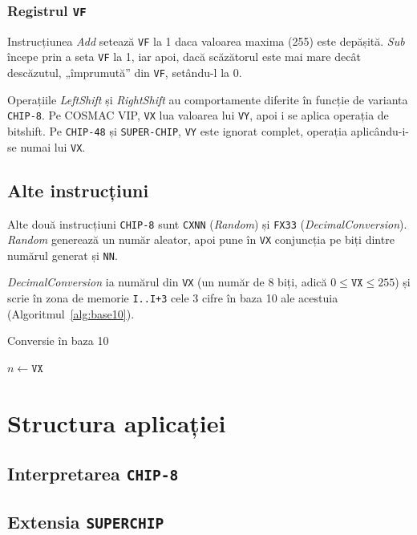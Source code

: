 \documentclass[a4paper]{article}
\begin{document}
\subsubsection{Registrul \texttt{VF}}
Instrucțiunea \textit{Add} setează \texttt{VF} la 1 daca valoarea maxima (255) este depășită. \textit{Sub} începe prin a seta \texttt{VF} la 1, iar apoi,
dacă scăzătorul este mai mare decât descăzutul, „împrumută” din \texttt{VF}, setându-l la 0.

Operațiile \textit{LeftShift} și \textit{RightShift} au comportamente diferite în funcție de varianta \texttt{CHIP-8}. Pe COSMAC VIP, \texttt{VX} lua valoarea
lui \texttt{VY}, apoi i se aplica operația de bitshift. Pe \texttt{CHIP-48} și \texttt{SUPER-CHIP}, \texttt{VY} este ignorat complet, operația aplicându-i-se
numai lui \texttt{VX}.

\subsection{Alte instrucțiuni}
Alte două instrucțiuni \texttt{CHIP-8} sunt \texttt{CXNN} (\textit{Random}) și \texttt{FX33} (\textit{DecimalConversion}).
\textit{Random} generează un număr aleator, apoi pune în \texttt{VX} conjuncția pe biți dintre numărul generat și \texttt{NN}.

\textit{DecimalConversion} ia numărul din \texttt{VX} (un număr de 8 biți, adică $0 \leq \texttt{VX} \leq 255$) și scrie în zona de memorie \texttt{I..I+3}
cele 3 cifre în baza 10 ale acestuia (Algoritmul~\ref{alg:base10}).

\begin{algorithm}
	\caption{Conversie în baza 10}\label{alg:base10}
	$n \gets \texttt{VX}$\;
\end{algorithm}


\section{Structura aplicației}
\subsection{Interpretarea \texttt{CHIP-8}}
\subsection{Extensia \texttt{SUPERCHIP}}
\end{document}
